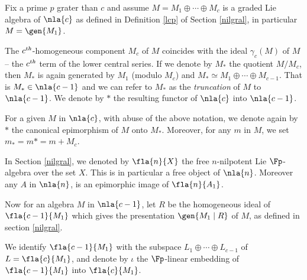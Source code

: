 Fix a prime $p$ grater than $c$ and
assume $M=M_{1}\oplus\cdots\oplus M_{c}$ is a graded Lie algebra of $\nla{c}$ as defined
in Definition \ref{lcp} of Section \ref{nilgral}, in particular $M=\gen{M_{1}}$.

The $c^{\textsl{th}}$-homogeneous component $M_{c}$ of $M$ coincides
with the ideal $\gamma_{c}(M)$ of $M$ -- the $c^{\textsl{th}}$ term of the lower central series.
If we denote by $M_{*}$ the quotient $M/M_{c}$, then $M_{*}$ is
again generated by $M_{1}$ (modulo $M_{c}$) and $M_{*}\simeq M_{1}\oplus\cdots\oplus M_{c-1}$. That is $M_{*}\in\nla{c-1}$ and we can refer to $M_{*}$ as the {\em truncation} of $M$ to $\nla{c-1}$. We denote by $\ast$ the resulting functor of $\nla{c}$ into $\nla{c-1}$.

For a given $M$ in $\nla{c}$, with
abuse of the above notation, we denote again by $\ast$ the canonical epimorphism of $M$ onto $M_{*}$.
Moreover, for any $m$ in $M$, we set $m_{*}=m\ast=m+M_{c}$.

\medskip
In Section \ref{nilgral}, we denoted by $\fla{n}{X}$ the free $n$-nilpotent Lie $\Fp$-algebra over the set $X$. This is
in particular a free object of $\nla{n}$.
Moreover any $A$ in $\nla{n}$, is an epimorphic image of $\fla{n}{A_{1}}$.

\smallskip
Now for an algebra $M$ in $\nla{c-1}$, let $R$ be the homogeneous ideal of $\fla{c-1}{M_{1}}$ which gives
the presentation $\gen{M_{1}\mid R}$ of $M$, as defined in section \ref{nilgral}.

We identify $\fla{c-1}{M_{1}}$ with the subspace $L_{1}\oplus\cdots\oplus L_{c-1}$ of $L=\fla{c}{M_{1}}$, and denote by
$\iota$ the $\Fp$-linear embedding of $\fla{c-1}{M_{1}}$ into $\fla{c}{M_{1}}$.


